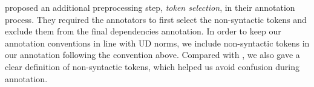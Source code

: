 \documentclass[11pt,a4paper]{article}
\newcommand{\nascomment}[1]{\textcolor{blue}{[#1 ---\textsc{nas}]}}
\begin{document}




 proposed an additional
preprocessing step, \emph{token selection}, in their annotation process.
They required the annotators to first select the non-syntactic
tokens and exclude them from the final dependencies annotation.
In order to keep our annotation conventions in line with UD norms,
we include non-syntactic tokens in our annotation following the
convention above. Compared with \citet{kong-EtAl:2014:EMNLP2014},
we also gave a clear definition of non-syntactic tokens, which helped
us avoid confusion during annotation.
\end{document}
